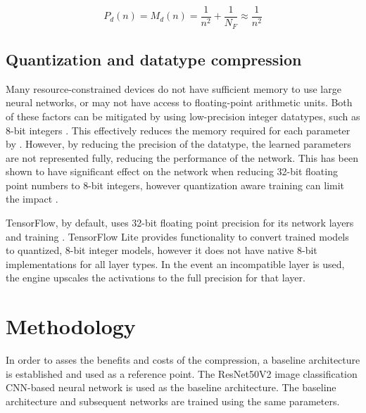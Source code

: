 \documentclass{article}
\begin{document}
	\begin{equation} \label{eqn:depthwise}
		P_d(n) = M_d(n) = \frac{1}{n^2} + \frac{1}{N_F} \approx \frac{1}{n^2}
	\end{equation}
	
	
	\subsection{Quantization and datatype compression}
	
	Many resource-constrained devices do not have sufficient memory to use large neural networks, or may not have access to floating-point arithmetic units. Both of these factors can be mitigated by using low-precision integer datatypes, such as 8-bit integers \cite{scalable8bit,quantfriendlymobilenet}. This effectively reduces the memory required for each parameter by . However, by reducing the precision of the datatype, the learned parameters are not represented fully, reducing the performance of the network. This has been shown to have significant effect on the network when reducing 32-bit floating point numbers to 8-bit integers, however quantization aware training can limit the impact \cite{scalable8bit}. 
	
	TensorFlow, by default, uses 32-bit floating point precision for its network layers and training \cite{tensorflow2015-whitepaper}. TensorFlow Lite provides functionality to convert trained models to quantized, 8-bit integer models, however it does not have native 8-bit implementations for all layer types. In the event an incompatible layer is used, the engine upscales the activations to the full precision for that layer.
	
	\section{Methodology}
	\label{sec:methodology}
	In order to asses the benefits and costs of the compression, a baseline architecture is established and used as a reference point. The ResNet50V2 image classification CNN-based neural network is used as the baseline architecture. The baseline architecture and subsequent networks are trained using the same parameters. 
	
\end{document}
